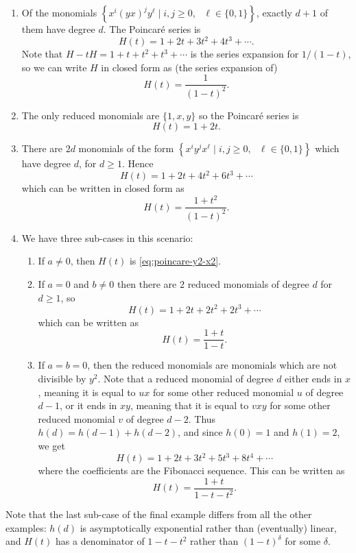\begin{enumerate}
	\item Of the monomials $\left\{x^i(yx)^jy^\ell\mid i,j\ge 0,\text{ }\ell\in\{0,1\}\right\}$, exactly $d+1$ of them have degree $d$. The Poincar\'e series is
	\begin{equation}
		H(t) = 1 + 2t + 3t^2 + 4t^3 + \cdots.\label{eq:poincare-y2-x2}
	\end{equation}
	Note that $H - tH = 1 + t + t^2 + t^3 + \cdots$ is the series expansion for $1/(1-t)$, so we can write $H$ in closed form as (the series expansion of)
	\[
		H(t) = \frac{1}{(1-t)^2}.
	\]
	\item The only reduced monomials are $\{1,x,y\}$ so the Poincar\'e series is
	\[
		H(t) = 1 + 2t.
	\]
	\setcounter{enumi}{3}
	\item There are $2d$ monomials of the form $\left\{x^iy^jx^\ell\mid i,j\ge 0,\text{ }\ell\in\{0,1\}\right\}$ which have degree $d$, for $d \geq 1$. Hence
	\[
		H(t) = 1 + 2t + 4t^2 + 6t^3 + \cdots
	\]
	which can be written in closed form as
	\[
		H(t) = \frac{1+t^2}{(1-t)^2}.
	\]
	\item We have three sub-cases in this scenario:
	\begin{enumerate}
		\item If $a\neq 0$, then $H(t)$ is \eqref{eq:poincare-y2-x2}.
		\item If $a = 0$ and $b\neq 0$ then there are $2$ reduced monomials of degree $d$ for $d \geq 1$, so
		\[
			H(t) = 1 + 2t + 2t^2 + 2t^3 + \cdots
		\]
		which can be written as
		\[
			H(t) = \frac{1+t}{1-t}.
		\]
		\item If $a = b = 0$, then the reduced monomials are monomials which are not divisible by $y^2$. Note that a reduced monomial of degree $d$ either ends in $x$, meaning it is equal to $ux$ for some other reduced monomial $u$ of degree $d-1$, or it ends in $xy$, meaning that it is equal to $vxy$ for some other reduced monomial $v$ of degree $d-2$. Thus $h(d) = h(d-1) + h(d-2)$, and since $h(0) = 1$ and $h(1) = 2$, we get
		\[
			H(t) = 1 + 2t + 3t^2 + 5t^3 + 8t^4 + \cdots
		\] 
		where the coefficients are the Fibonacci sequence. This can be written as
		\[
			H(t) = \frac{1 + t}{1 - t - t^2}.
		\]
	\end{enumerate}
\end{enumerate}
Note that the last sub-case of the final example differs from all the other examples: $h(d)$ is asymptotically exponential rather than (eventually) linear, and $H(t)$ has a denominator of $1 - t - t^2$ rather than $(1-t)^\delta$ for some $\delta$.

